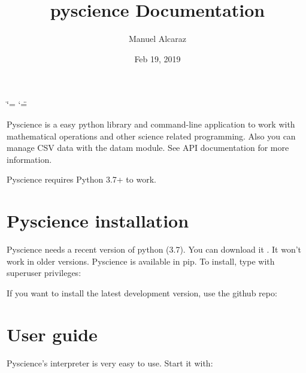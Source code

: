 \documentclass[letterpaper,10pt,english]{sphinxmanual}
\title{pyscience Documentation}
\date{Feb 19, 2019}
\author{Manuel Alcaraz}
\begin{document}
\ifdefined\shorthandoff
  \ifnum\catcode`\=\string=\active\shorthandoff{=}\fi
  \ifnum\catcode`\"=\active{}\fi
\fi

\pagestyle{empty}
\sphinxmaketitle
\pagestyle{plain}
\sphinxtableofcontents
\pagestyle{normal}
\label{\detokenize{index::doc}}


Pyscience is a easy python library and command-line application to work with
mathematical operations and other science related programming. Also you can manage
CSV data with the datam module. See API documentation for more information.

Pyscience requires Python 3.7+ to work.


\chapter{Pyscience installation}
\label{\detokenize{installation:pyscience-installation}}\label{\detokenize{installation::doc}}
Pyscience needs a recent version of python (3.7). You can download it . It won’t work in older versions.
Pyscience is available in pip. To install, type with superuser privileges:

\begin{sphinxVerbatim}[commandchars=\\\{\}]
  
\end{sphinxVerbatim}

If you want to install the latest development version, use the github repo:

\begin{sphinxVerbatim}[commandchars=\\\{\}]
     
\end{sphinxVerbatim}


\chapter{User guide}
\label{\detokenize{user_guide:user-guide}}\label{\detokenize{user_guide::doc}}
Pyscience’s interpreter is very easy to use. Start it with:

\begin{sphinxVerbatim}[commandchars=\\\{\}]
\end{sphinxVerbatim}
\end{document}
